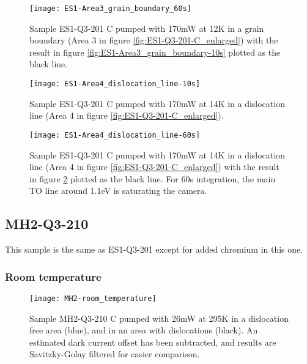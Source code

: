 \begin{figure}[H]
\centering
\texttt{[image: ES1-Area3\_grain\_boundary\_60s]}
\caption[ES1-Q3-201 at a grain boundary]{Sample ES1-Q3-201 C pumped with 170mW at 12K in a grain boundary (Area 3 in figure \ref{fig:ES1-Q3-201-C_enlarged}) with the result in figure \ref{fig:ES1-Area3_grain_boundary-10s} plotted as the black line.}
\label{fig:ES1-Area3_grain_boundary_60s}%
\end{figure}


\begin{figure}[H]
\centering
\texttt{[image: ES1-Area4\_dislocation\_line-10s]}
\caption[ES1-Q3-201 at a dislocation line]{Sample ES1-Q3-201 C pumped with 170mW at 14K in a dislocation line (Area 4 in figure \ref{fig:ES1-Q3-201-C_enlarged}).}
\label{fig:ES1-Area4_dislocation_line-10s}%
\end{figure}

\begin{figure}[H]
\centering
\texttt{[image: ES1-Area4\_dislocation\_line-60s]}
\caption[ES1-Q3-201 at a dislocation line]{Sample ES1-Q3-201 C pumped with 170mW at 14K in a dislocation line (Area 4 in figure \ref{fig:ES1-Q3-201-C_enlarged}) with the result in figure \ref{fig:ES1-Area4_dislocation_line-10s} plotted as the black line. For 60s integration, the main TO line around 1.1eV is saturating the camera.}
\label{fig:ES1-Area4_dislocation_line-60s}%
\end{figure}

\subsection{MH2-Q3-210}

This sample is the same as ES1-Q3-201 except for added chromium in this one.

\subsubsection{Room temperature}

\begin{figure}[H]
\centering
\texttt{[image: MH2-room\_temperature]}
\caption[MH2-Q3-210 at room temperature]{Sample MH2-Q3-210 C pumped with 26mW at 295K in a dislocation free area (blue), and in an area with dislocations (black). An estimated dark current offset has been subtracted, and results are Savitzky-Golay filtered for easier comparison.}
\label{fig:MH2-room_temperature}%
\end{figure}

